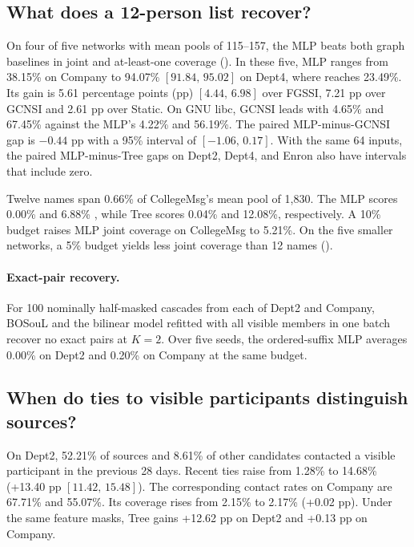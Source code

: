 \subsection{What does a 12-person list recover?}
On four of five networks with mean pools of 115--157, the MLP beats both graph baselines in joint and at-least-one coverage (). In these five, MLP \anytwelve{} ranges from 38.15\% on Company to 94.07\% $[91.84,\,95.02]$ on Dept4, where \both{} reaches 23.49\%. Its \both{} gain is 5.61 percentage points (pp) $[4.44,\,6.98]$ over FGSSI, 7.21 pp over GCNSI and 2.61 pp over Static. On GNU libc, GCNSI leads with 4.65\% \both{} and 67.45\% \anytwelve{} against the MLP's 4.22\% and 56.19\%. The paired MLP-minus-GCNSI gap is $-0.44$ pp with a 95\% interval of $[-1.06,\,0.17]$. With the same 64 inputs, the paired MLP-minus-Tree gaps on Dept2, Dept4, and Enron also have intervals that include zero.


Twelve names span 0.66\% of CollegeMsg's mean pool of 1,830. The MLP scores 0.00\% \both{} and 6.88\% \anytwelve{}, while Tree scores 0.04\% and 12.08\%, respectively. A 10\% budget raises MLP joint coverage on CollegeMsg to 5.21\%. On the five smaller networks, a 5\% budget yields less joint coverage than 12 names ().

\paragraph{Exact-pair recovery.}
For 100 nominally half-masked cascades from each of Dept2 and Company, BOSouL and the bilinear model refitted with all visible members in one batch recover no exact pairs at $K=2$. Over five seeds, the ordered-suffix MLP averages 0.00\% on Dept2 and 0.20\% on Company at the same budget.

\subsection{When do ties to visible participants distinguish sources?}
On Dept2, 52.21\% of sources and 8.61\% of other candidates contacted a visible participant in the previous 28 days. Recent ties raise \both{} from 1.28\% to 14.68\% (+13.40 pp $[11.42,\,15.48]$). The corresponding contact rates on Company are 67.71\% and 55.07\%. Its coverage rises from 2.15\% to 2.17\% (+0.02 pp). Under the same feature masks, Tree gains +12.62 pp on Dept2 and +0.13 pp on Company.

